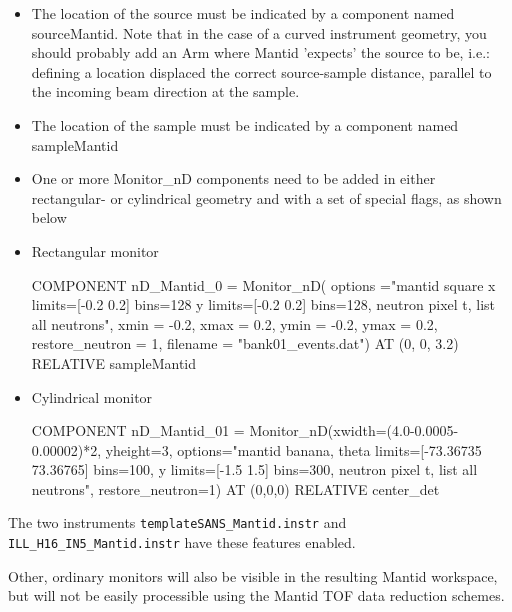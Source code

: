 \begin{itemize}
\item The location of the source must be indicated by a component
  named sourceMantid. Note that in the case of a curved instrument
  geometry, you should probably add an Arm where Mantid 'expects' the
  source to be, i.e.: defining a location displaced the correct
  source-sample distance, parallel to the incoming beam direction at
  the sample.
\item The location of the sample must be indicated by a component
  named sampleMantid
\item One or more Monitor\_nD components need to be added in either
  rectangular- or cylindrical geometry and with a set of special
  flags, as shown below
\item Rectangular monitor
  \begin{mcstas}
    COMPONENT nD_Mantid_0 = Monitor_nD(
    options ="mantid square x limits=[-0.2 0.2] bins=128 y limits=[-0.2 0.2] bins=128, neutron pixel t, list all neutrons",
    xmin = -0.2,
    xmax = 0.2,
    ymin = -0.2,
    ymax = 0.2,
    restore_neutron = 1,
    filename = "bank01_events.dat")
  AT (0, 0, 3.2) RELATIVE sampleMantid 
\end{mcstas}
\item Cylindrical monitor
  \begin{mcstas}
    COMPONENT nD_Mantid_01 = Monitor_nD(xwidth=(4.0-0.0005-0.00002)*2, yheight=3,
    options="mantid banana, theta limits=[-73.36735 73.36765] bins=100, y limits=[-1.5 1.5] bins=300, neutron pixel t, list all neutrons", restore_neutron=1)
    AT (0,0,0) RELATIVE center_det
\end{mcstas}
\end{itemize}
The two instruments \verb+templateSANS_Mantid.instr+ and
\verb+ILL_H16_IN5_Mantid.instr+ have these features enabled.

Other, ordinary \MCS monitors will also be visible in the resulting
Mantid workspace, but will not be easily processible using the Mantid
TOF data reduction schemes.

